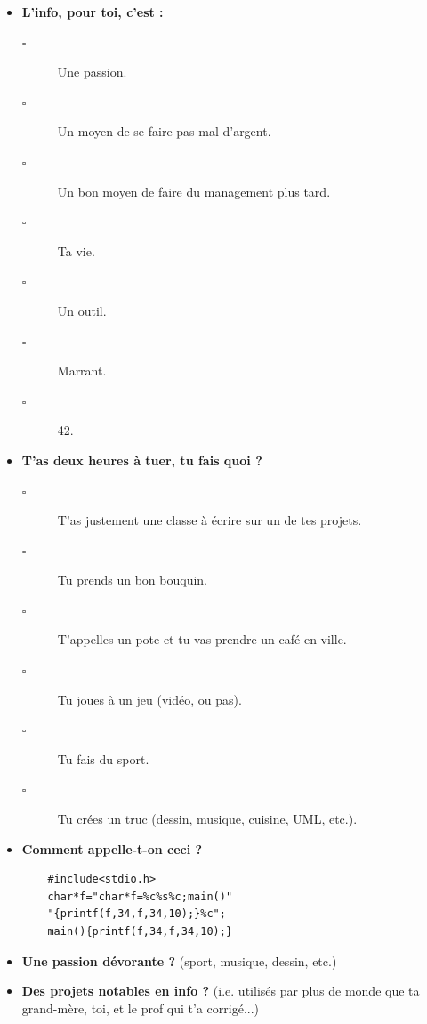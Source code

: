 \begin{itemize}
    \item \textbf{L'info, pour toi, c'est :}
    \begin{description}
	\item[$\square$] Une passion.
	\item[$\square$] Un moyen de se faire pas mal d'argent.
	\item[$\square$] Un bon moyen de faire du management plus tard.
	\item[$\square$] Ta vie.
	\item[$\square$] Un outil.
	\item[$\square$] Marrant.
	\item[$\square$] 42.
    \end{description}
    \item \textbf{T'as deux heures à tuer, tu fais quoi ?}
    \begin{description}
	\item[$\square$] T'as justement une classe à écrire sur un de tes projets.
	\item[$\square$] Tu prends un bon bouquin.
	\item[$\square$] T'appelles un pote et tu vas prendre un café en ville.
	\item[$\square$] Tu joues à un jeu (vidéo, ou pas).
	\item[$\square$] Tu fais du sport.
	\item[$\square$] Tu crées un truc (dessin, musique, cuisine, UML, etc.).
    \end{description}

    \item \textbf{Comment appelle-t-on ceci ?}
    \begin{verbatim}
	#include<stdio.h>
	char*f="char*f=%c%s%c;main()"
	"{printf(f,34,f,34,10);}%c";
	main(){printf(f,34,f,34,10);}
    \end{verbatim}
    \vspace{1cm}
    \item \textbf{Une passion dévorante ?} (sport, musique, dessin, etc.)
    \vspace{2cm}
    \item \textbf{Des projets notables en info ?} (i.e. utilisés par plus de monde que ta
	    grand-mère, toi, et le prof qui t'a corrigé...)
    \vspace{2cm}
\end{itemize}
